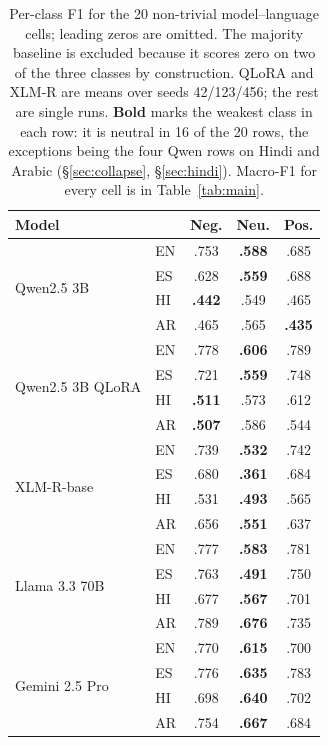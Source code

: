 \documentclass[11pt]{article}
\begin{document}
\begin{table}[H]
\centering\scriptsize
\setlength{\tabcolsep}{3pt}
\renewcommand{\arraystretch}{0.85}
\begin{tabular}{@{}llccc@{}}
\toprule
Model & & Neg. & Neu. & Pos. \\
\midrule
\multirow{4}{*}{Qwen2.5 3B}
 & EN & .753 & \textbf{.588} & .685 \\
 & ES & .628 & \textbf{.559} & .688 \\
 & HI & \textbf{.442} & .549 & .465 \\
 & AR & .465 & .565 & \textbf{.435} \\
\midrule
\multirow{4}{*}{Qwen2.5 3B QLoRA}
 & EN & .778 & \textbf{.606} & .789 \\
 & ES & .721 & \textbf{.559} & .748 \\
 & HI & \textbf{.511} & .573 & .612 \\
 & AR & \textbf{.507} & .586 & .544 \\
\midrule
\multirow{4}{*}{XLM-R-base}
 & EN & .739 & \textbf{.532} & .742 \\
 & ES & .680 & \textbf{.361} & .684 \\
 & HI & .531 & \textbf{.493} & .565 \\
 & AR & .656 & \textbf{.551} & .637 \\
\midrule
\multirow{4}{*}{Llama 3.3 70B}
 & EN & .777 & \textbf{.583} & .781 \\
 & ES & .763 & \textbf{.491} & .750 \\
 & HI & .677 & \textbf{.567} & .701 \\
 & AR & .789 & \textbf{.676} & .735 \\
\midrule
\multirow{4}{*}{Gemini 2.5 Pro}
 & EN & .770 & \textbf{.615} & .700 \\
 & ES & .776 & \textbf{.635} & .783 \\
 & HI & .698 & \textbf{.640} & .702 \\
 & AR & .754 & \textbf{.667} & .684 \\
\bottomrule
\end{tabular}
\caption{Per-class F1 for the 20 non-trivial model--language cells; leading
zeros are omitted. The majority baseline is excluded because it scores zero on two
of the three classes by construction. QLoRA and \mbox{XLM-R} are means over seeds
42/123/456; the rest are single runs. \textbf{Bold} marks the weakest class in each
row: it is neutral in 16 of the 20 rows, the exceptions being the four Qwen rows on
Hindi and Arabic (\S\ref{sec:collapse}, \S\ref{sec:hindi}). Macro-F1 for every cell is in
Table~\ref{tab:main}.}
\label{tab:perclass}
\end{table}
\renewcommand{\arraystretch}{1}
\end{document}

